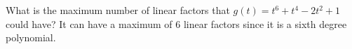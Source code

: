 {What is the maximum number of linear factors that $g(t) = t^6+t^4-2t^2 +1$ could have?}
{It can have a maximum of 6 linear factors since it is a sixth degree polynomial.}
